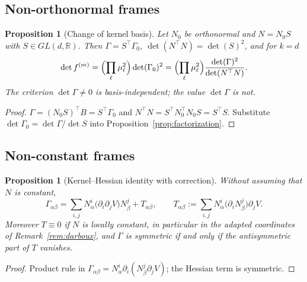 \documentclass[12pt]{article}
\theoremstyle{plain}
\newtheorem{proposition}[theorem]{Proposition}
\theoremstyle{definition}
\theoremstyle{remark}
\newcommand{\R}{\mathbb{R}}
\newcommand{\pd}[1]{\partial_{#1}}
\begin{document}
	\subsection{Non-orthonormal frames}
	
	\begin{proposition}[Change of kernel basis]
		\label{prop:basis}
		Let $N_{0}$ be orthonormal and $N=N_{0}S$ with $S\in GL(d,\R)$. Then
		$\Gamma=S^{\top}\Gamma_{0}$, $\det(N^{\top}N)=\det(S)^{2}$, and for $k=d$
		\begin{equation}
			\det f^{(m)}
			=\Bigl(\prod_{\ell}\mu_{\ell}^{2}\Bigr)\det(\Gamma_{0})^{2}
			=\Bigl(\prod_{\ell}\mu_{\ell}^{2}\Bigr)
			\frac{\det(\Gamma)^{2}}{\det(N^{\top}N)} .
			\label{eq:basiscorr}
		\end{equation}
		The criterion $\det\Gamma\neq0$ is basis-independent; the value $\det\Gamma$ is
		not.
	\end{proposition}
	
	\begin{proof}
		$\Gamma=(N_{0}S)^{\top}B=S^{\top}\Gamma_{0}$ and
		$N^{\top}N=S^{\top}N_{0}^{\top}N_{0}S=S^{\top}S$. Substitute
		$\det\Gamma_{0}=\det\Gamma/\det S$ into Proposition~\ref{prop:factorization}.
	\end{proof}
	
	\subsection{Non-constant frames}
	
	\begin{proposition}[Kernel--Hessian identity with correction]
		\label{prop:Tterm}
		Without assuming that $N$ is constant,
		\begin{equation}
			\Gamma_{\alpha\beta}
			=\sum_{i,j}N_{\alpha}^{i}\bigl(\pd{i}\pd{j}V\bigr)N_{\beta}^{j}
			+T_{\alpha\beta},
			\qquad
			T_{\alpha\beta}:=\sum_{i,j}N_{\alpha}^{i}\bigl(\pd{i}N_{\beta}^{j}\bigr)\pd{j}V .
			\label{eq:Tterm}
		\end{equation}
		Moreover $T\equiv0$ if $N$ is locally constant, in particular in the adapted
		coordinates of Remark~\ref{rem:darboux}, and $\Gamma$ is symmetric if and only
		if the antisymmetric part of $T$ vanishes.
	\end{proposition}
	
	\begin{proof}
		Product rule in $\Gamma_{\alpha\beta}=N_{\alpha}^{i}\pd{i}
		(N_{\beta}^{j}\pd{j}V)$; the Hessian term is symmetric.
	\end{proof}
	
\end{document}

